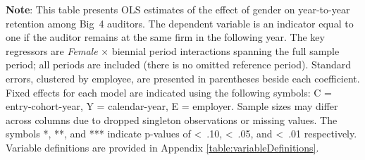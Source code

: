 \documentclass[11pt]{article}
\begin{document}
\clearpage
\begin{table}[!htbp]
\begin{flushleft}
    \begin{threeparttable}[b]

        \captionsetup{labelfont=bf, singlelinecheck=off, justification=raggedright, labelsep=none}
        \caption{: Female retention in Big 4 audit}

        

        \begin{tablenotes}
            \footnotesize
            \item \textbf{Note}: This table presents OLS estimates of the effect of gender on year-to-year retention among Big~4 auditors. The dependent variable is an indicator equal to one if the auditor remains at the same firm in the following year. The key regressors are \textit{Female} $\times$ biennial period interactions spanning the full sample period; all periods are included (there is no omitted reference period). Standard errors, clustered by employee, are presented in parentheses beside each coefficient. Fixed effects for each model are indicated using the following symbols: C = entry-cohort-year, Y = calendar-year, E = employer. Sample sizes may differ across columns due to dropped singleton observations or missing values. The symbols *, **, and *** indicate p-values of \textless\, .10, \textless\, .05, and \textless\, .01 respectively. Variable definitions are provided in Appendix \ref{table:variableDefinitions}.
        \end{tablenotes}
        \label{table:mainB4}
    \end{threeparttable}
\end{flushleft}
\end{table}

\end{document}
